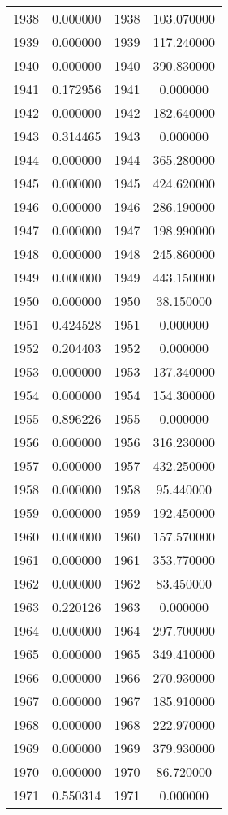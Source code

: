 \documentclass[12pt]{article}
\begin{document}
\begin{longtable}{@{}cccc@{}}
1938 & 0.000000 & 1938 & 103.070000 \\
1939 & 0.000000 & 1939 & 117.240000 \\
1940 & 0.000000 & 1940 & 390.830000 \\
1941 & 0.172956 & 1941 & 0.000000 \\
1942 & 0.000000 & 1942 & 182.640000 \\
1943 & 0.314465 & 1943 & 0.000000 \\
1944 & 0.000000 & 1944 & 365.280000 \\
1945 & 0.000000 & 1945 & 424.620000 \\
1946 & 0.000000 & 1946 & 286.190000 \\
1947 & 0.000000 & 1947 & 198.990000 \\
1948 & 0.000000 & 1948 & 245.860000 \\
1949 & 0.000000 & 1949 & 443.150000 \\
1950 & 0.000000 & 1950 & 38.150000 \\
1951 & 0.424528 & 1951 & 0.000000 \\
1952 & 0.204403 & 1952 & 0.000000 \\
1953 & 0.000000 & 1953 & 137.340000 \\
1954 & 0.000000 & 1954 & 154.300000 \\
1955 & 0.896226 & 1955 & 0.000000 \\
1956 & 0.000000 & 1956 & 316.230000 \\
1957 & 0.000000 & 1957 & 432.250000 \\
1958 & 0.000000 & 1958 & 95.440000 \\
1959 & 0.000000 & 1959 & 192.450000 \\
1960 & 0.000000 & 1960 & 157.570000 \\
1961 & 0.000000 & 1961 & 353.770000 \\
1962 & 0.000000 & 1962 & 83.450000 \\
1963 & 0.220126 & 1963 & 0.000000 \\
1964 & 0.000000 & 1964 & 297.700000 \\
1965 & 0.000000 & 1965 & 349.410000 \\
1966 & 0.000000 & 1966 & 270.930000 \\
1967 & 0.000000 & 1967 & 185.910000 \\
1968 & 0.000000 & 1968 & 222.970000 \\
1969 & 0.000000 & 1969 & 379.930000 \\
1970 & 0.000000 & 1970 & 86.720000 \\
1971 & 0.550314 & 1971 & 0.000000 \\

\end{longtable}
\end{document}
